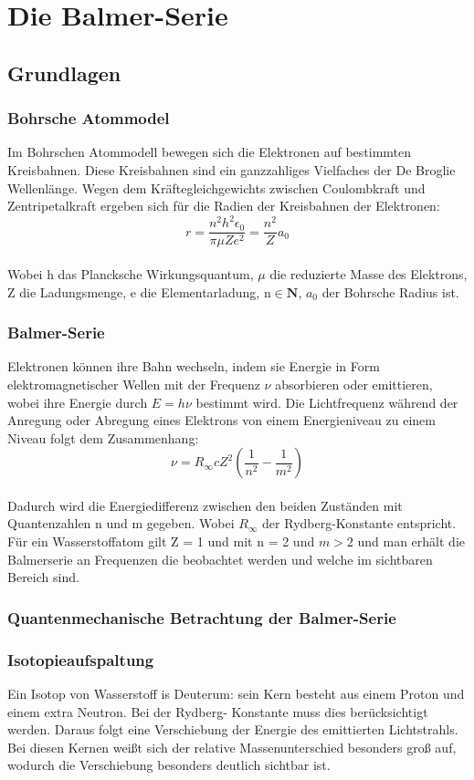 \chapter{Die Balmer-Serie}
\section{Grundlagen}
\subsection{Bohrsche Atommodel}
Im Bohrschen Atommodell bewegen sich die Elektronen auf bestimmten Kreisbahnen. Diese Kreisbahnen sind ein ganzzahliges Vielfaches der De Broglie Wellenlänge.
Wegen dem Kräftegleichgewichts zwischen Coulombkraft und Zentripetalkraft ergeben sich für die Radien der Kreisbahnen der Elektronen:
\begin{equation}
    r = \frac{n^2 h^2 \epsilon_0}{\pi \mu Z e^2} = \frac{n^2}{Z} a_0
\end{equation}\\
Wobei h das Plancksche Wirkungsquantum, $\mu$ die reduzierte Masse des Elektrons, Z die
Ladungsmenge, e die Elementarladung, n$\in \mathbf{N}$, $a_0$  der Bohrsche Radius ist.
\subsection{Balmer-Serie}
Elektronen können ihre Bahn wechseln, indem sie Energie in Form elektromagnetischer Wellen mit der Frequenz $\nu$ absorbieren oder emittieren, wobei ihre Energie durch $E = h\nu$ bestimmt wird. Die Lichtfrequenz während der Anregung oder Abregung eines Elektrons von einem Energieniveau zu einem Niveau folgt dem Zusammenhang:
\begin{equation}
    \nu = R_{\infty} c Z^2 \left( \frac{1}{n^2} - \frac{1}{m^2} \right)
\end{equation}\\
Dadurch wird die Energiedifferenz zwischen den beiden Zuständen mit Quantenzahlen n und m gegeben. Wobei $R_{\infty}$ der Rydberg-Konstante entspricht.\\
Für ein Wasserstoffatom gilt Z = 1 und mit n = 2 und $m> 2$ und man erhält die Balmerserie an Frequenzen die beobachtet werden und welche im sichtbaren Bereich sind.
\subsection{Quantenmechanische Betrachtung der Balmer-Serie}
\subsection{Isotopieaufspaltung}
Ein Isotop von Wasserstoff is Deuterum: sein Kern besteht aus einem Proton und einem extra Neutron.
Bei der Rydberg- Konstante muss dies berücksichtigt werden. Daraus folgt eine Verschiebung der Energie des emittierten Lichtstrahls. Bei diesen Kernen weißt sich der relative Massenunterschied besonders groß auf, wodurch die Verschiebung besonders deutlich sichtbar ist.
